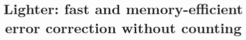 \documentclass{bmcart}
\begin{document}
\graphicspath{ {./eps} }

\newcommand{\forexample}{e.g.\@\xspace}
\newcommand{\thatis}{i.e.\@\xspace}
\newcommand{\andothers}{et al.\@\xspace}
\newcommand{\kmer}{\ensuremath{k}-mer\xspace}
\newcommand{\kmers}{\ensuremath{k}-mers\xspace}
\newcommand{\tool}{Lighter\xspace}
\newcommand{\ecoli}{\emph{E. coli}\xspace}
\newcommand{\ecolinoemph}{E. coli\xspace}
\newcommand{\elegans}{\emph{C. elegans}\xspace}

\newcommand\myworries[1]{\textcolor{red}{#1}}%

\begin{frontmatter}

\begin{fmbox}

\title{Lighter: fast and memory-efficient error correction without counting}




\author[
	addressref={aff1},
	email={lsong10@jhu.edu}
]{  }
\author[
	addressref={aff2, aff1},
	email={florea@jhu.edu}
]{ }
\author[
	addressref={aff1, aff2},
	corref={aff1},
	email={langmea@cs.jhu.edu}
]{ }



\end{fmbox}
\end{frontmatter}
\end{document}
